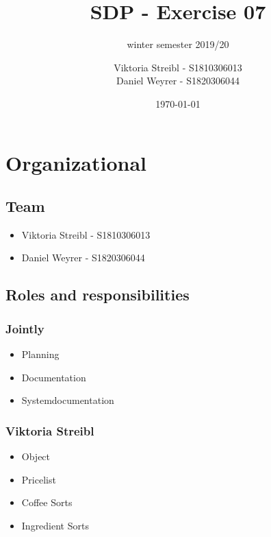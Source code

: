 
\graphicspath{{./}}



\title{SDP - Exercise 07} %
\subtitle{winter semester 2019/20} %
\author{
Viktoria Streibl - S1810306013\\
  Daniel Weyrer - S1820306044
} %
\date{\today} %

\maketitle %

\newpage
\tableofcontents %
\newpage


\section{Organizational}
\subsection{Team}
\begin{itemize}
	\item Viktoria 	Streibl 		- 	S1810306013
	\item Daniel 	Weyrer		-	S1820306044
\end{itemize}

\subsection{Roles and responsibilities}
\subsubsection{Jointly}
\begin{itemize}
	\item Planning
	\item Documentation
	\item Systemdocumentation
\end{itemize}

\subsubsection{Viktoria Streibl}
\begin{itemize}
	\item Object
	\item Pricelist
	\item Coffee Sorts
	\item Ingredient Sorts		
\end{itemize}


